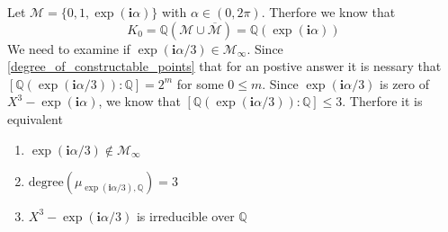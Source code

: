 Let $\mathcal{M} = \{0,1,\exp(\textbf{i} \alpha)\}$ with $\alpha \in (0,2\pi)$. Therfore we know that
\begin{equation*}
    K_0 = \mathbb{Q}(\mathcal{M}\cup \overline{\mathcal{M}}) = \mathbb{Q}(\exp(\textbf{i} \alpha))
\end{equation*}
We need to examine if $\exp(\textbf{i} \alpha/3) \in \mathcal{M}_{\infty}$. Since \ref{degree_of_constructable_points}
that for an postive answer it is nessary that $[\mathbb{Q}(\exp(\textbf{i} \alpha/3)):\mathbb{Q}] = 2^m$ for some $0 \le m $. \newline
Since $\exp(\textbf{i} \alpha/3)$ is zero of $X^3 - \exp(\textbf{i} \alpha)$, we know that $[\mathbb{Q}(\exp(\textbf{i} \alpha/3)):\mathbb{Q}] \le 3$.
Therfore it is equivalent
\begin{enumerate}
    \item $\exp(\textbf{i} \alpha/3) \notin \mathcal{M}_{\infty}$
    \item $\text{degree}(\mu_{\exp(\textbf{i} \alpha/3),\mathbb{Q}}) = 3$
    \item $X^3 - \exp(\textbf{i} \alpha/3)$ is irreducible over $\mathbb{Q}$
\end{enumerate}

